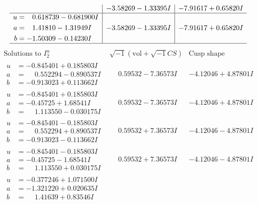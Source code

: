 \documentclass[1p]{elsarticle_modified}
\theoremstyle{definition}
\newcommand{\I}{\sqrt{-1}}
\begin{document}
$$\begin{array}{c|c|c}
 & -3.58269 - 1.33395 I & -7.91617 + 0.65820 I \\ \hline\begin{aligned}
u &= \phantom{-}0.618739 - 0.681900 I \\
a &= \phantom{-}1.41810 - 1.31949 I \\
b &= -1.50309 - 0.14230 I\end{aligned}
 & -3.58269 - 1.33395 I & -7.91617 + 0.65820 I\\
 \hline 
 \end{array}$$\newpage$$\begin{array}{c|c|c}  
\text{Solutions to }I^u_{2}& \I (\text{vol} + \sqrt{-1}CS) & \text{Cusp shape}\\
 \hline 
\begin{aligned}
u &= -0.845401 + 0.185803 I \\
a &= \phantom{-}0.552294 - 0.890537 I \\
b &= -0.913023 + 0.113662 I\end{aligned}
 & \phantom{-}0.59532 - 7.36573 I & -4.12046 + 4.87801 I \\ \hline\begin{aligned}
u &= -0.845401 + 0.185803 I \\
a &= -0.45725 + 1.68541 I \\
b &= \phantom{-}1.113550 - 0.030175 I\end{aligned}
 & \phantom{-}0.59532 - 7.36573 I & -4.12046 + 4.87801 I \\ \hline\begin{aligned}
u &= -0.845401 - 0.185803 I \\
a &= \phantom{-}0.552294 + 0.890537 I \\
b &= -0.913023 - 0.113662 I\end{aligned}
 & \phantom{-}0.59532 + 7.36573 I & -4.12046 - 4.87801 I \\ \hline\begin{aligned}
u &= -0.845401 - 0.185803 I \\
a &= -0.45725 - 1.68541 I \\
b &= \phantom{-}1.113550 + 0.030175 I\end{aligned}
 & \phantom{-}0.59532 + 7.36573 I & -4.12046 - 4.87801 I \\ \hline\begin{aligned}
u &= -0.377246 + 1.071500 I \\
a &= -1.321220 + 0.020635 I \\
b &= \phantom{-}1.41639 + 0.83546 I\end{aligned}

\end{array}$$
\end{document}
